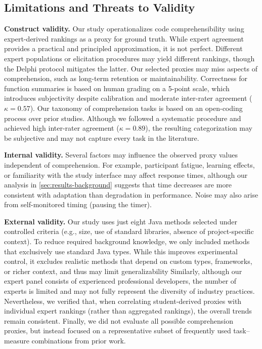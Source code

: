 \subsection{Limitations and Threats to Validity}
\label{sec:limitations}

\textbf{Construct validity.}
Our study operationalizes code comprehensibility using
expert-derived rankings as a proxy for ground truth. While
expert agreement provides a practical and principled
approximation, it is not perfect.
Different expert populations or elicitation procedures
may yield different rankings, though the Delphi protocol mitigates the latter.
Our selected proxies may miss aspects of comprehension, such as long-term retention or
maintainability. Correctness for function summaries is based on human grading on a 5-point scale, which introduces subjectivity despite calibration and
moderate inter-rater agreement ($\kappa = 0.57$). Our taxonomy of comprehension tasks is based on an open-coding
process over prior studies. Although we followed a systematic
procedure and achieved high inter-rater agreement ($\kappa =
0.89$), the resulting categorization may be subjective
and may not capture every task in the literature.

\textbf{Internal validity.}
Several factors may influence the observed proxy values
independent of comprehension. For example, participant fatigue,
learning effects, or familiarity with the study interface may
affect response times, although our analysis in \cref{sec:results-background} suggests that time
decreases are more consistent with adaptation than degradation in
performance. Noise may also arise from self-monitored
timing (\eg pausing the timer).


\textbf{External validity.}
Our study uses just eight Java methods selected under
controlled criteria (e.g., size, use of standard libraries,
absence of project-specific context). To reduce required
background knowledge, we only included methods that exclusively use standard Java types.
While this improves experimental control,
it excludes realistic methods that depend on custom
types, frameworks, or richer context, and thus may limit
generalizability Similarly, although our expert panel consists of experienced professional
developers, the number of experts is limited and may not fully represent
the diversity of industry practices. Nevertheless, we verified
that, when correlating student-derived proxies with individual
expert rankings (rather than aggregated rankings), the overall
trends remain consistent. Finally, we did not evaluate all
possible comprehension proxies, but instead focused on a
representative subset of frequently used task–measure combinations
from prior work.  
